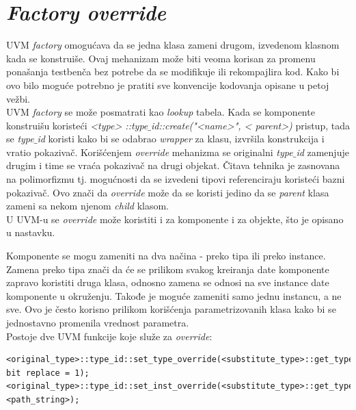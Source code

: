 
\section{\emph{Factory override}}

UVM \emph{factory} omogućava da se jedna klasa zameni drugom, izvedenom klasnom
kada se konstruiše. Ovaj mehanizam može biti veoma korisan za promenu ponašanja
testbenča bez potrebe da se modifikuje ili rekompajlira kod. Kako bi ovo bilo
moguće potrebno je pratiti sve konvencije kodovanja opisane u petoj vežbi.\\

UVM \emph{factory} se može posmatrati kao \emph{lookup} tabela. Kada se
komponente konstruišu koristeći \emph{\textless type\textgreater
  ::type\(\_\)id::create("\textless name\textgreater ", \textless
  parent\textgreater )} pristup, tada se \emph{type\(\_\)id} koristi kako bi se
odabrao \emph{wrapper} za klasu, izvršila konstrukcija i vratio pokazivač.
Korišćenjem \emph{override} mehanizma se originalni \emph{type\(\_\)id}
zamenjuje drugim i time se vraća pokazivač na drugi objekat. Čitava tehnika je
zasnovana na polimorfizmu tj. mogućnosti da se izvedeni tipovi referenciraju
koristeći bazni pokazivač. Ovo znači da \emph{override} može da se koristi
jedino da se \emph{parent} klasa zameni sa nekom njenom \emph{child} klasom.\\

U UVM-u se \emph{override} može koristiti i za komponente i za objekte, što je
opisano u nastavku.

Komponente se mogu zameniti na dva načina - preko tipa ili preko instance.
Zamena preko tipa znači da će se prilikom svakog kreiranja date komponente
zapravo koristiti druga klasa, odnosno zamena se odnosi na sve instance date
komponente u okruženju. Takođe je moguće zameniti samo jednu instancu, a ne
sve. Ovo je često korisno prilikom korišćenja parametrizovanih klasa kako bi se
jednostavno promenila vrednost parametra.\\

Postoje dve UVM funkcije koje služe za \emph{override}:

\begin{lstlisting}
<original_type>::type_id::set_type_override(<substitute_type>::get_type(), bit replace = 1);
<original_type>::type_id::set_inst_override(<substitute_type>::get_type(),string <path_string>);
\end{lstlisting}

